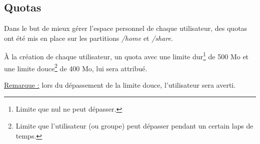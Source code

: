 \subsection{Quotas}
\label{subsec:quotas}

Dans le but de mieux gérer l'espace personnel de chaque utilisateur, des quotas
ont été mis en place sur les partitions \textit{/home} et \textit{/share}.

À la création de chaque utilisateur, un quota avec une limite
dur\footnote{Limite que nul ne peut dépasser.} de 500 Mo et une limite
douce\footnote{Limite que l'utilisateur (ou groupe) peut dépasser pendant un
certain laps de temps.} de 400 Mo, lui sera attribué.

\underline{Remarque :} lors du dépassement de la limite douce, l'utilisateur
sera averti.

